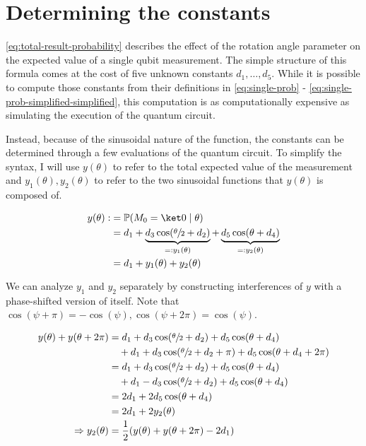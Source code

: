 \section{Determining the constants}
\label{sec:constants}
\autoref{eq:total-result-probability} describes the effect of the rotation angle
parameter on the expected value of a single qubit measurement.
The simple structure of this formula comes at the cost of five unknown
constants $d_1, \dots, d_5$.
While it is possible to compute those constants from their definitions in
\autoref{eq:single-prob} - \ref{eq:single-prob-simplified-simplified},
this computation is as computationally expensive as simulating the execution of
the quantum circuit.

Instead, because of the sinusoidal nature of the function, the constants can be
determined through a few evaluations of the quantum circuit.
To simplify the syntax, I will use $y(\theta)$ to refer to the total expected
value of the measurement and $y_1(\theta), y_2(\theta)$ to refer to the two
sinusoidal functions that $y(\theta)$ is composed of.

\begin{equation}
    \label{eq:y}
    \begin{split}
        y(\theta) :&= \mathbb{P}(M_0 = \ket0 \mid \theta)\\
            &= d_1 + \underbrace{d_3 \cos(\sfrac\theta2 + d_2)}_{=: y_1(\theta)} + \underbrace{d_5 \cos(\theta + d_4)}_{=: y_2(\theta)}\\
            &= d_1 + y_1(\theta) + y_2(\theta)
    \end{split}
\end{equation}

We can analyze $y_1$ and $y_2$ separately by constructing interferences of $y$
with a phase-shifted version of itself.
Note that
$\cos(\psi + \pi) = -\cos(\psi), \cos(\psi + 2\pi) = \cos(\psi)$.

\begin{equation}
    \label{eq:d1+y2}
    \begin{split}
        y(\theta) + y(\theta + 2\pi)
            &= d_1 + d_3 \cos(\sfrac\theta2 + d_2) + d_5 \cos(\theta + d_4)\\
                &\quad + d_1 + d_3 \cos(\sfrac\theta2 + d_2 + \pi) + d_5 \cos(\theta + d_4 + 2\pi)\\
            &= d_1 + d_3 \cos(\sfrac\theta2 + d_2) + d_5 \cos(\theta + d_4)\\
                &\quad + d_1 - d_3 \cos(\sfrac\theta2 + d_2) + d_5 \cos(\theta + d_4)\\
            &= 2 d_1 + 2 d_5 \cos(\theta + d_4)\\
            &= 2 d_1 + 2 y_2(\theta)\\
        \Rightarrow y_2(\theta) &= \frac12 (y(\theta) + y(\theta + 2\pi) - 2 d_1)
    \end{split}
\end{equation}


